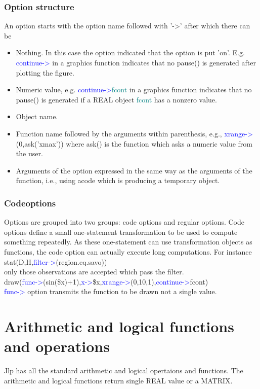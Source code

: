 \subsubsection{Option structure}
\label{optionstructure}
An option starts with the option name
followed with '->' after which there can be
\begin{itemize}
\item Nothing. In this case the option indicated that the option is put 'on'. E.g.
\textcolor{blue}{continue->} in a graphics function indicates that no \textcolor{VioletRed}{pause}() is generated after plotting the figure.
\item Numeric value, e.g. \textcolor{blue}{continue->}\textcolor{teal}{fcont} in a graphics function
indicates that no \textcolor{VioletRed}{pause}() is generated if a REAL object \textcolor{teal}{fcont} has a nonzero value.

\item Object name.
\item Function name followed by the arguments within parenthesis, e.g.,
\textcolor{blue}{xrange->}(0,\textcolor{VioletRed}{ask}('xmax')) where \textcolor{VioletRed}{ask}() is the function which asks a numeric value from the user.
\item Arguments of the option expressed in the same way as the arguments of the function, i.e.,
using acode which is producing a temporary object.
\end{itemize}
\subsubsection{Codeoptions}
\label{codeoption}
Options are grouped into two groups: code options and regular options.
Code options
define a small one-statement transformation to be used to compute something repeatedly.
As these one-statement can use transformation objects as functions, the code option can actually
execute long computations. For instance \\
\textcolor{VioletRed}{stat}(D,H,\textcolor{blue}{filter->}(region.eq.savo)) \\
only those observations are accepted which pass the filter.\\
\textcolor{VioletRed}{draw}(\textcolor{blue}{func->}(\textcolor{VioletRed}{sin}(\$x)+1),\textcolor{blue}{x->}\$x,\textcolor{blue}{xrange->}(0,10,1),\textcolor{blue}{continue->}fcont)\\
\textcolor{blue}{func->} option
transmits the function to be drawn not a single value.
\section{Arithmetic and logical functions and operations}
\label{arith}
Jlp has all the standard arithmetic and logical opertaions and functions.
The arithmetic and logical functions return single REAL value or a MATRIX.
